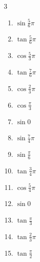 \begin{multicols}{3}
\begin{enumerate}
  \item $\displaystyle \sin{\frac{5}{6}\pi}$

  \item $\displaystyle \tan{\frac{5}{6}\pi}$

  \item $\displaystyle \cos{\frac{5}{3}\pi}$

  \item $\displaystyle \tan{\frac{7}{6}\pi}$

  \item $\displaystyle \cos{\frac{2}{3}\pi}$

  \item $\displaystyle \cos{\frac{\pi}{3}}$

  \item $\displaystyle \sin{0}$
        \phantom{$\displaystyle =0$}

\columnbreak %

  \item $\displaystyle \sin{\frac{7}{4}\pi}$

  \item $\displaystyle \sin{\frac{\pi}{6}}$

  \item $\displaystyle \tan{\frac{3}{4}\pi}$
        \phantom{$\displaystyle =-1$}

  \item $\displaystyle \cos{\frac{5}{4}\pi}$

  \item $\displaystyle \sin{0}$
        \phantom{$\displaystyle =0$}

  \item $\displaystyle \tan{\frac{\pi}{3}}$

  \item $\displaystyle \tan{\frac{2}{3}\pi}$

  \item $\displaystyle \tan{\frac{\pi}{2}}$
        \phantom{$\displaystyle \quad なし$}


\end{enumerate}
\end{multicols}
